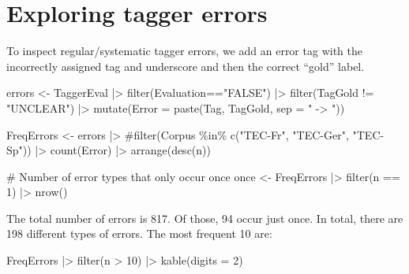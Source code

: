 \documentclass[
  letterpaper,
  DIV=11,
  numbers=noendperiod]{scrreprt}
\newenvironment{Shaded}{\begin{snugshade}}{\end{snugshade}}
\newcommand{\AttributeTok}[1]{\textcolor[rgb]{0.40,0.45,0.13}{#1}}
\newcommand{\CommentTok}[1]{\textcolor[rgb]{0.37,0.37,0.37}{#1}}
\newcommand{\DecValTok}[1]{\textcolor[rgb]{0.68,0.00,0.00}{#1}}
\newcommand{\FunctionTok}[1]{\textcolor[rgb]{0.28,0.35,0.67}{#1}}
\newcommand{\NormalTok}[1]{\textcolor[rgb]{0.00,0.23,0.31}{#1}}
\newcommand{\OtherTok}[1]{\textcolor[rgb]{0.00,0.23,0.31}{#1}}
\newcommand{\SpecialCharTok}[1]{\textcolor[rgb]{0.37,0.37,0.37}{#1}}
\newcommand{\StringTok}[1]{\textcolor[rgb]{0.13,0.47,0.30}{#1}}
\begin{document}
\section{Exploring tagger errors}\label{exploring-tagger-errors}

To inspect regular/systematic tagger errors, we add an error tag with
the incorrectly assigned tag and underscore and then the correct
``gold'' label.

\begin{Shaded}
\begin{Highlighting}[]
\NormalTok{errors }\OtherTok{\textless{}{-}}\NormalTok{ TaggerEval }\SpecialCharTok{|\textgreater{}} 
  \FunctionTok{filter}\NormalTok{(Evaluation}\SpecialCharTok{==}\StringTok{"FALSE"}\NormalTok{) }\SpecialCharTok{|\textgreater{}} 
  \FunctionTok{filter}\NormalTok{(TagGold }\SpecialCharTok{!=} \StringTok{"UNCLEAR"}\NormalTok{) }\SpecialCharTok{|\textgreater{}} 
  \FunctionTok{mutate}\NormalTok{(}\AttributeTok{Error =} \FunctionTok{paste}\NormalTok{(Tag, TagGold, }\AttributeTok{sep =} \StringTok{" {-}\textgreater{} "}\NormalTok{))}

\NormalTok{FreqErrors }\OtherTok{\textless{}{-}}\NormalTok{ errors }\SpecialCharTok{|\textgreater{}} 
  \CommentTok{\#filter(Corpus \%in\% c("TEC{-}Fr", "TEC{-}Ger", "TEC{-}Sp")) |\textgreater{} }
  \FunctionTok{count}\NormalTok{(Error) }\SpecialCharTok{|\textgreater{}} 
  \FunctionTok{arrange}\NormalTok{(}\FunctionTok{desc}\NormalTok{(n))}

\CommentTok{\# Number of error types that only occur once}
\NormalTok{once }\OtherTok{\textless{}{-}}\NormalTok{ FreqErrors }\SpecialCharTok{|\textgreater{}} 
  \FunctionTok{filter}\NormalTok{(n }\SpecialCharTok{==} \DecValTok{1}\NormalTok{) }\SpecialCharTok{|\textgreater{}} 
  \FunctionTok{nrow}\NormalTok{()}
\end{Highlighting}
\end{Shaded}

The total number of errors is 817. Of those, 94 occur just once. In
total, there are 198 different types of errors. The most frequent 10
are:

\begin{Shaded}
\begin{Highlighting}[]
\NormalTok{FreqErrors }\SpecialCharTok{|\textgreater{}} 
  \FunctionTok{filter}\NormalTok{(n }\SpecialCharTok{\textgreater{}} \DecValTok{10}\NormalTok{) }\SpecialCharTok{|\textgreater{}} 
  \FunctionTok{kable}\NormalTok{(}\AttributeTok{digits =} \DecValTok{2}\NormalTok{)}
\end{Highlighting}
\end{Shaded}
\end{document}
